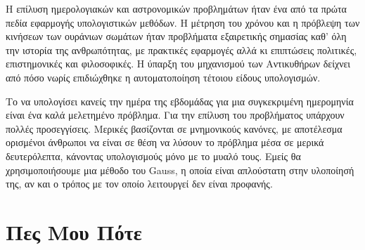 \documentclass[a4paper,11pt,oneside]{book}
\begin{document}
\bonustrue
{}

Η επίλυση ημερολογιακών και αστρονομικών προβλημάτων ήταν ένα από τα πρώτα πεδία εφαρμογής υπολογιστικών μεθόδων. Η μέτρηση του χρόνου και η πρόβλεψη των κινήσεων των ουράνιων σωμάτων ήταν προβλήματα εξαιρετικής σημασίας καθ' όλη την ιστορία της ανθρωπότητας, με πρακτικές εφαρμογές αλλά κι επιπτώσεις πολιτικές, επιστημονικές και φιλοσοφικές. Η ύπαρξη του μηχανισμού των Αντικυθήρων δείχνει από πόσο νωρίς επιδιώχθηκε η αυτοματοποίηση τέτοιου είδους υπολογισμών. 

Το να υπολογίσει κανείς την ημέρα της εβδομάδας για μια συγκεκριμένη ημερομηνία είναι ένα καλά μελετημένο πρόβλημα. Για την επίλυση του προβλήματος υπάρχουν πολλές προσεγγίσεις. Μερικές βασίζονται σε μνημονικούς κανόνες, με αποτέλεσμα ορισμένοι άνθρωποι να είναι σε θέση να λύσουν το πρόβλημα μέσα σε μερικά δευτερόλεπτα, κάνοντας υπολογισμούς μόνο με το μυαλό τους. Εμείς θα χρησιμοποιήσουμε μια μέθοδο του Gauss, η οποία είναι απλούστατη στην υλοποίησή της, αν και ο τρόπος με τον οποίο λειτουργεί δεν είναι προφανής.




\section{Πες Μου Πότε}
\end{document}
